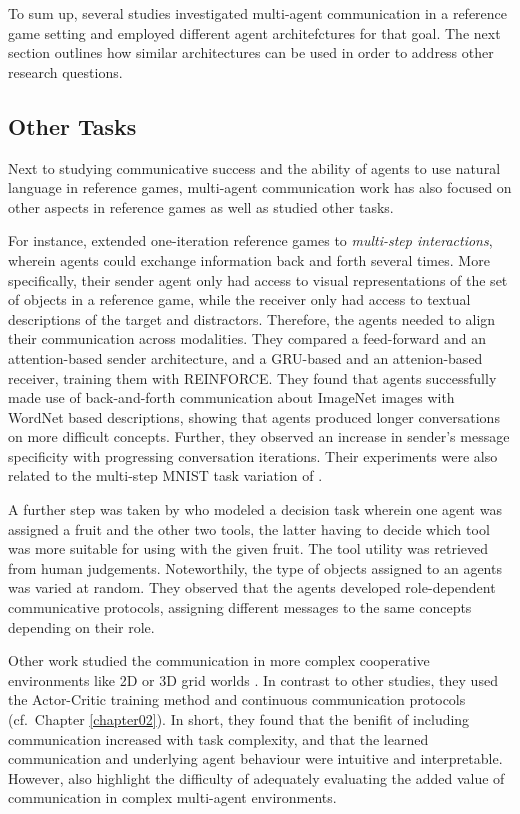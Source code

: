 To sum up, several studies investigated multi-agent communication in a reference game setting and employed different agent architefctures for that goal. The next section outlines how similar architectures can be used in order to address other research questions.

\subsection{Other Tasks}

Next to studying communicative success and the ability of agents to use natural language in reference games, multi-agent communication work has also focused on other aspects in reference games as well as studied other tasks.
 
For instance, \cite{evtimova2017emergent} extended one-iteration reference games to \textit{multi-step interactions}, wherein agents could exchange information back and forth several times. More specifically, their sender agent only had access to visual representations of the set of objects in a reference game, while the receiver only had access to textual descriptions of the target and distractors. Therefore, the agents needed to align their communication across modalities. They compared a feed-forward and an attention-based sender architecture, and a GRU-based and an attenion-based receiver, training them with REINFORCE. They found that agents successfully made use of back-and-forth communication about ImageNet images with WordNet based descriptions, showing that agents produced longer conversations on more difficult concepts. Further, they observed an increase in sender's message specificity with progressing conversation iterations.
Their experiments were also related to the multi-step MNIST task variation of \cite{foerster2016learning}.

A further step was taken by \cite{bouchacourt2019miss} who modeled a decision task wherein one agent was assigned a fruit and the other two tools, the latter having to decide which tool was more suitable for using with the given fruit. The tool utility was retrieved from human judgements. Noteworthily, the type of objects assigned to an agents was varied at random. They observed that the agents developed role-dependent communicative protocols, assigning different messages to the same concepts depending on their role. 

Other work studied the communication in more complex cooperative environments like 2D or 3D grid worlds \parencite{das2019tarmac}. In contrast to other studies, they used the Actor-Critic training method and continuous communication protocols (cf.~Chapter \ref{chapter02}). In short, they found that the benifit of including communication increased with task complexity, and that the learned communication and underlying agent behaviour were intuitive and interpretable. However, \cite{lowe2019pitfalls} also highlight the difficulty of adequately evaluating the added value of communication in complex multi-agent environments.

